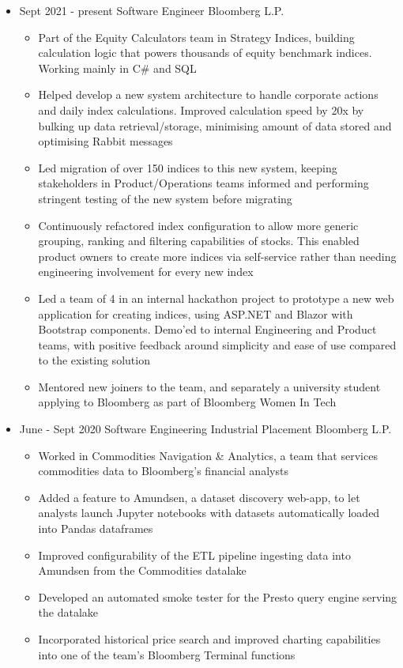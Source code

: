 \documentclass[11pt,a4paper,sans]{moderncv}        %
\begin{document}
\begin{itemize}

\item{
\cventry
{Sept 2021 - present}
{Software Engineer}
{Bloomberg L.P.}
{}{}{
\begin{itemize}
\item Part of the Equity Calculators team in Strategy Indices, building calculation logic that powers thousands of equity benchmark indices. Working mainly in C\# and SQL
\item Helped develop a new system architecture to handle corporate actions and daily index calculations. Improved calculation speed by 20x by bulking up data retrieval/storage, minimising amount of data stored and optimising Rabbit messages
\item Led migration of over 150 indices to this new system, keeping stakeholders in Product/Operations teams informed and performing stringent testing of the new system before migrating
\item Continuously refactored index configuration to allow more generic grouping, ranking and filtering capabilities of stocks. This enabled product owners to create more indices via self-service rather than needing engineering involvement for every new index
\item Led a team of 4 in an internal hackathon project to prototype a new web application for creating indices, using ASP.NET and Blazor with Bootstrap components. Demo'ed to internal Engineering and Product teams, with positive feedback around simplicity and ease of use compared to the existing solution
\item Mentored new joiners to the team, and separately a university student applying to Bloomberg as part of Bloomberg Women In Tech
\end{itemize}
}}

\item{
\cventry
{June - Sept 2020}
{Software Engineering Industrial Placement}
{Bloomberg L.P.}
{}{}{
\begin{itemize}
\item Worked in Commodities Navigation \& Analytics, a team that services commodities data to Bloomberg's financial analysts
\item Added a feature to Amundsen, a dataset discovery web-app, to let analysts launch Jupyter notebooks with datasets automatically loaded into Pandas dataframes
\item Improved configurability of the ETL pipeline ingesting data into Amundsen from the Commodities datalake
\item Developed an automated smoke tester for the Presto query engine serving the datalake
\item Incorporated historical price search and improved charting capabilities into one of the team's Bloomberg Terminal functions
\end{itemize}
}}


\end{itemize}
\end{document}

